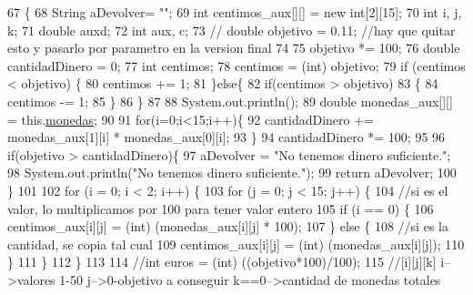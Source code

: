 \begin{DoxyCode}
67                                             \{
68         String aDevolver= \textcolor{stringliteral}{""};
69         \textcolor{keywordtype}{int} centimos\_aux[][] = \textcolor{keyword}{new} \textcolor{keywordtype}{int}[2][15];
70         \textcolor{keywordtype}{int} i, j, k;
71         \textcolor{keywordtype}{double} auxd;
72         \textcolor{keywordtype}{int} aux, c;
73        \textcolor{comment}{// double objetivo = 0.11; //hay que quitar esto y pasarlo por parametro en la version final}
74         
75         objetivo *= 100;
76         \textcolor{keywordtype}{double} cantidadDinero = 0;
77         \textcolor{keywordtype}{int} centimos;
78         centimos = (int) objetivo;
79         \textcolor{keywordflow}{if} (centimos < objetivo) \{
80             centimos += 1;
81         \}\textcolor{keywordflow}{else}\{
82             \textcolor{keywordflow}{if}(centimos > objetivo)
83             \{
84                 centimos -= 1;
85             \}
86         \}
87         
88         System.out.println();
89         \textcolor{keywordtype}{double} monedas\_aux[][] = this.\mbox{\hyperlink{classalgoritmia2_1_1_algoritmos_a7c670acfc4ef3b85c2e6908773014a13}{monedas}};
90         
91         \textcolor{keywordflow}{for}(i=0;i<15;i++)\{
92             cantidadDinero += monedas\_aux[1][i] * monedas\_aux[0][i];
93         \}
94         cantidadDinero *= 100;
95         
96         \textcolor{keywordflow}{if}(objetivo > cantidadDinero)\{
97             aDevolver = \textcolor{stringliteral}{"No tenemos dinero suficiente."};
98             System.out.println(\textcolor{stringliteral}{"No tenemos dinero suficiente."});
99             \textcolor{keywordflow}{return} aDevolver;
100         \}
101         
102         \textcolor{keywordflow}{for} (i = 0; i < 2; i++) \{
103             \textcolor{keywordflow}{for} (j = 0; j < 15; j++) \{
104                 \textcolor{comment}{//si es el valor, lo multiplicamos por 100 para tener valor entero}
105                 \textcolor{keywordflow}{if} (i == 0) \{
106                     centimos\_aux[i][j] = (int) (monedas\_aux[i][j] * 100);
107                 \} \textcolor{keywordflow}{else} \{
108                     \textcolor{comment}{//si es la cantidad, se copia tal cual}
109                     centimos\_aux[i][j] = (int) (monedas\_aux[i][j]);
110                 \}
111             \}
112         \}
113 
114         \textcolor{comment}{//int euros = (int) ((objetivo*100)/100);}
115         \textcolor{comment}{//[i][j][k]   i-->valores 1-50   j-->0-objetivo a conseguir   k==0-->cantidad de monedas totales   
}
\end{DoxyCode}
